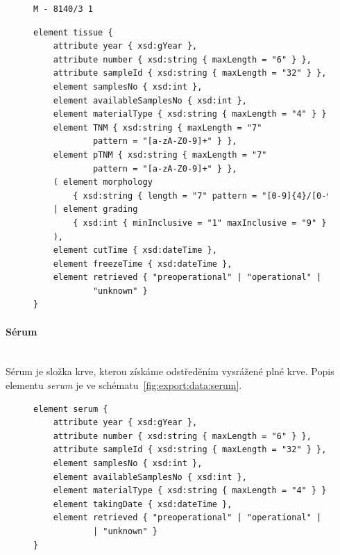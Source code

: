 \documentclass[11pt,draft,oneside]{fithesis2}
\newcommand{\paragraphNewLine}[1]{\paragraph*{#1}\mbox{}\\}
\begin{document}
\begin{figure}[h!] %
\centering
\begin{BVerbatim}
M - 8140/3 1
\end{BVerbatim}
\end{figure}

\begin{figure}[h!]
\begin{center}
\begin{lstlisting}[language=XML, caption={Element popisující tkáň v~exportním schématu.},
label={fig:export:data:tissue}]
element tissue {
	attribute year { xsd:gYear },
	attribute number { xsd:string { maxLength = "6" } },
	attribute sampleId { xsd:string { maxLength = "32" } },
	element samplesNo { xsd:int },
	element availableSamplesNo { xsd:int },
	element materialType { xsd:string { maxLength = "4" } },
	element TNM { xsd:string { maxLength = "7" 
			pattern = "[a-zA-Z0-9]+" } },
	element pTNM { xsd:string { maxLength = "7" 
			pattern = "[a-zA-Z0-9]+" } },
	( element morphology 
		{ xsd:string { length = "7" pattern = "[0-9]{4}/[0-9]{2}"} } 
	| element grading 
		{ xsd:int { minInclusive = "1" maxInclusive = "9" } } 
	),
	element cutTime { xsd:dateTime },
	element freezeTime { xsd:dateTime },
	element retrieved { "preoperational" | "operational" | "post" | 
			"unknown" }
}
\end{lstlisting}
\end{center}
\end{figure}

\paragraphNewLine{Sérum}
Sérum je složka krve, kterou získáme odstředěním vysrážené plné krve. Popis elementu \textit{serum} je ve schématu~\ref{fig:export:data:serum}.
\begin{figure}[hbtp]
\begin{center}
\begin{lstlisting}[language=XML, caption={Element popisující sérum v~exportním schématu.},
label={fig:export:data:serum}]
element serum {
	attribute year { xsd:gYear },
	attribute number { xsd:string { maxLength = "6" } },
	attribute sampleId { xsd:string { maxLength = "32" } },
	element samplesNo { xsd:int },
	element availableSamplesNo { xsd:int },
	element materialType { xsd:string { maxLength = "4" } }
	element takingDate { xsd:dateTime },
	element retrieved { "preoperational" | "operational" | "post" 
			| "unknown" }
}
\end{lstlisting}
\end{center}
\end{figure}
\end{document}
